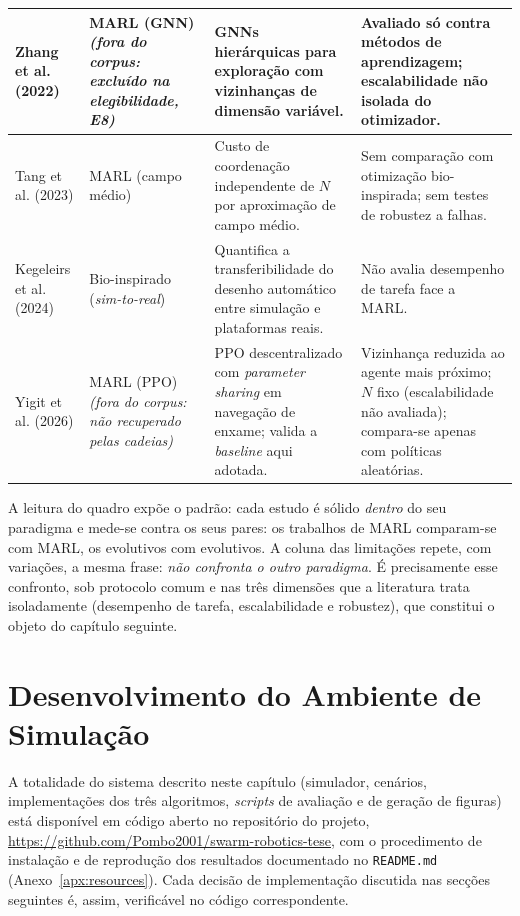 \documentclass[12pt,reqno, twoside]{amsbook}
\theoremstyle{plain}
\numberwithin{equation}{chapter}
\numberwithin{section}{chapter}
\numberwithin{table}{chapter}
\numberwithin{figure}{chapter}
\begin{document}
\begin{table}[!htbp]
\begin{tabular}{|p{2.6cm}|p{2.3cm}|p{4.2cm}|p{4.2cm}|}
        Zhang et al. (2022) \cite{zhang2022h2gnn} & MARL (GNN) \newline \textit{(fora do corpus: excluído na elegibilidade, E8)} & GNNs hierárquicas para exploração com vizinhanças de dimensão variável. & Avaliado só contra métodos de aprendizagem; escalabilidade não isolada do otimizador. \\ \hline

        Tang et al. (2023) \cite{tang2023meanfield} & MARL (campo médio) & Custo de coordenação independente de $N$ por aproximação de campo médio. & Sem comparação com otimização bio-inspirada; sem testes de robustez a falhas. \\ \hline

        Kegeleirs et al. (2024) \cite{kegeleirs2024transfer} & Bio-inspirado (\textit{sim-to-real}) & Quantifica a transferibilidade do desenho automático entre simulação e plataformas reais. & Não avalia desempenho de tarefa face a MARL. \\ \hline

        Yigit et al. (2026) \cite{yigit2026marl} & MARL (PPO) \newline \textit{(fora do corpus: não recuperado pelas cadeias)} & PPO descentralizado com \textit{parameter sharing} em navegação de enxame; valida a \textit{baseline} aqui adotada. & Vizinhança reduzida ao agente mais próximo; $N$ fixo (escalabilidade não avaliada); compara-se apenas com políticas aleatórias. \\ \hline
    \end{tabular}
\end{table}

A leitura do quadro expõe o padrão: cada estudo é sólido \emph{dentro} do seu paradigma e mede-se contra os seus pares: os trabalhos de MARL comparam-se com MARL, os evolutivos com evolutivos. A coluna das limitações repete, com variações, a mesma frase: \emph{não confronta o outro paradigma}. É precisamente esse confronto, sob protocolo comum e nas três dimensões que a literatura trata isoladamente (desempenho de tarefa, escalabilidade e robustez), que constitui o objeto do capítulo seguinte.

\chapter{Desenvolvimento do Ambiente de Simulação}
\label{ch:simulation_env}

A totalidade do sistema descrito neste capítulo (simulador, cenários, implementações dos três algoritmos, \textit{scripts} de avaliação e de geração de figuras) está disponível em código aberto no repositório do projeto, \url{https://github.com/Pombo2001/swarm-robotics-tese}, com o procedimento de instalação e de reprodução dos resultados documentado no \texttt{README.md} (Anexo~\ref{apx:resources}). Cada decisão de implementação discutida nas secções seguintes é, assim, verificável no código correspondente.
\end{document}
